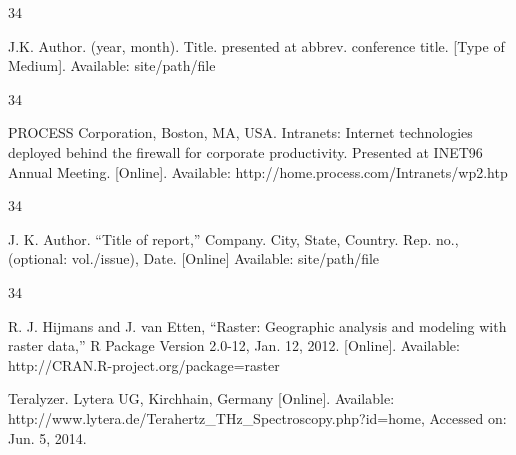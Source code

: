 \documentclass{IEEEjmw}
\begin{document}
\vspace*{-12pt}
\begin{thebibliography}{34}
\item[]\hskip-18pt J.K. Author. (year, month). Title. presented at abbrev. conference title. [Type of Medium]. Available: site/path/file
\end{thebibliography}\vspace*{-12pt}

\vspace*{-12pt}

\begin{thebibliography}{34}
\setcounter{enumiv}{16}

\bibitem{}PROCESS Corporation, Boston, MA, USA. Intranets: Internet technologies deployed behind the firewall for corporate productivity. Presented at INET96 Annual Meeting. [Online]. Available: http://home.process.com/Intranets/wp2.htp
\end{thebibliography}\vspace*{-3pt}

\vspace*{-12pt}
\begin{thebibliography}{34}
\item[]\hskip-18pt J. K. Author. ``Title of report,'' Company. City, State, Country. Rep. no., (optional: vol./issue), Date. [Online] Available: site/path/file 
\end{thebibliography}\vspace*{-11pt}

\vspace*{-12pt}

\begin{thebibliography}{34}
\setcounter{enumiv}{17}

\bibitem{}R. J. Hijmans and J. van Etten, ``Raster: Geographic analysis and modeling with raster data,'' R Package Version 2.0-12, Jan. 12, 2012. [Online]. Available: http://CRAN.R-project.org/package=raster 

\bibitem{}Teralyzer. Lytera UG, Kirchhain, Germany [Online]. Available: http://www.lytera.de/Terahertz\_THz\_Spectroscopy.php?id=home, Accessed on: Jun. 5, 2014.
\end{thebibliography}\vspace*{-3pt}
\end{document}
